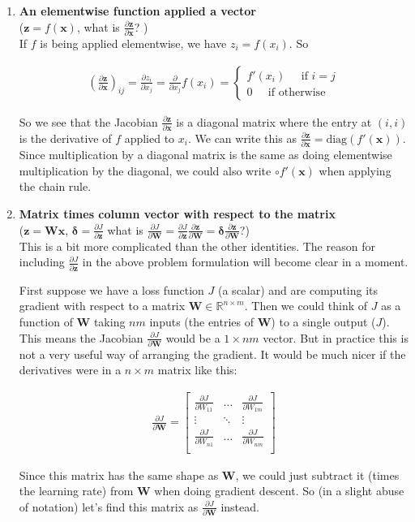 \documentclass{article}[11pt]
\newcommand{\bW} { \bm{W} }
\newcommand{\bz} { \bm{z} }
\newcommand{\bx} { \bm{x} }
\newcommand{\bdelta} { \bm{\delta} }
\newcommand{\diag} { \text{diag} }
\newcommand{\alns}[1] {
	\begin{align*} #1 \end{align*}
}
\newcommand{\pd}[2] {
 \frac{\partial #1}{\partial #2}
}
\begin{document}
\begin{enumerate}[(1)]
\item \textbf{An elementwise function applied a vector}\\ ($\bz = f(\bx)$, what is $\pd{\bz}{\bx}$? ) \\
If $f$ is being applied elementwise, we have $z_i = f(x_i)$. So
\alns{
	(\pd{\bz}{\bx})_{ij} = \pd{z_i}{x_j} = \pd{}{x_j}f(x_i) = \begin{cases}
	f'(x_i) \phantom{abc} \text{if $i = j$} \\
	0 \phantom{abc} \text{if otherwise} 
	\end{cases}
}
So we see that the Jacobian $\pd{\bz}{\bx}$ is a diagonal matrix where the entry at $(i, i)$ is the derivative of $f$ applied to $x_i$. We can write this as $\boxed{\pd{\bz}{\bx} = \diag(f'(\bx))}$. Since multiplication by a diagonal matrix is the same as doing elementwise multiplication by the diagonal, we could also write $\boxed{\circ f'(\bx)}$ when applying the chain rule.

\item \textbf{Matrix times column vector with respect to the matrix} \\ ($\bz = \bW \bx$, $\bdelta = \pd{J}{\bz}$ what is $\pd{J}{\bW} = \pd{J}{\bz} \pd{\bz}{\bW} = \bdelta \pd{\bz}{\bW}$?) \\

This is a bit more complicated than the other identities. The reason for including $\pd{J}{\bz}$%
in the above problem formulation will become clear in a moment.

First suppose we have a loss function $J$ (a scalar) and are computing its gradient with respect to a matrix $\bW \in \mathbb{R}^{n \times m}$. Then we could think of $J$ as a function of $\bW$ taking $nm$ inputs (the entries of $\bW$) to a single output ($J$). This means the Jacobian $\pd{J}{\bW}$ would be a $1 \times nm$ vector. But in practice this is not a very useful way of arranging the gradient. It would be much nicer if the derivatives were in a $n \times m$ matrix like this:
\alns{
	\pd{J}{\bW} = \begin{bmatrix}
		\pd{J}{W_{11}}  &  \dots   & \pd{J}{W_{1m}} \\
		\vdots             & \ddots  & \vdots            \\
		\pd{J}{W_{n1}} & \dots    & \pd{J}{W_{nm}}            \\
	\end{bmatrix}
}
Since this matrix has the same shape as $\bW$, we could just subtract it (times the learning rate) from $\bW$ when doing gradient descent. So (in a slight abuse of notation) let's find this matrix as $\pd{J}{\bW}$ instead.


\end{enumerate}
\end{document}
